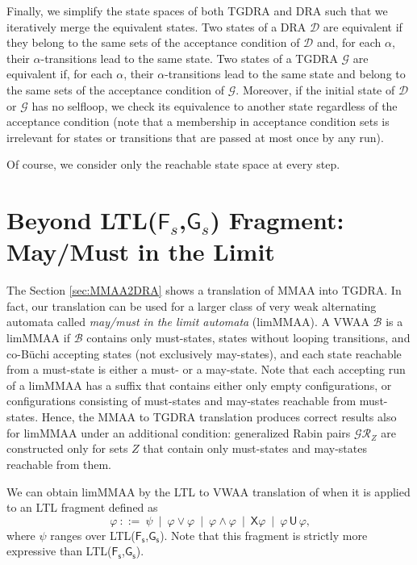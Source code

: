 \documentclass{llncs}
\newcommand{\X}{\mathsf{X}}     \newcommand{\U}{{\,\uU\,}}      \newcommand{\uU}{\mathsf{U}}    \newcommand{\rR}{\mathsf{R}}    \newcommand{\R}{{\,\rR\,}}      \newcommand{\F}{\mathsf{F}}     \newcommand{\G}{\mathsf{G}}     \newcommand{\Fs}{{\F\!\s}}      \newcommand{\Gs}{{\G\s}}        \newcommand{\s}{_\mathsf{s}}
\newcommand{\mB}{\mathcal{B}}
\newcommand{\mD}{\mathcal{D}}
\newcommand{\mG}{\mathcal{G}}
\newcommand{\mGR}{\mathcal{GR}}
\begin{document}
Finally, we simplify the state spaces of both TGDRA and DRA such that we
iteratively merge the equivalent states. Two states of a DRA $\mD$ are
equivalent if they belong to the same sets of the acceptance condition of
$\mD$ and, for each $\alpha$, their $\alpha$-transitions lead to the same
state. Two states of a TGDRA $\mG$ are equivalent if, for each $\alpha$,
their $\alpha$-transitions lead to the same state and belong to the same
sets of the acceptance condition of $\mG$. Moreover, if the initial state of
$\mD$ or $\mG$ has no selfloop, we check its equivalence to another state
regardless of the acceptance condition (note that a membership in acceptance
condition sets is irrelevant for states or transitions that are passed at
most once by any run).



Of course, we consider only the reachable state space at every step.



\section{Beyond LTL($\F_s$,$\G_s$) Fragment: May/Must in the Limit}
\label{sec:limmmaa}

The Section \ref{sec:MMAA2DRA} shows a translation of MMAA into TGDRA.  In
fact, our translation can be used for a larger class of very weak
alternating automata called \emph{may/must in the limit automata} (limMMAA).
A VWAA $\mB$ is a limMMAA if $\mB$ contains only must-states, states without
looping transitions, and co-B\"{u}chi accepting states (not exclusively
may-states), and each state reachable from a must-state is either a must- 
or a may-state. Note that each accepting run of a limMMAA has a suffix that
contains either only empty configurations, or configurations consisting of
must-states and may-states reachable from must-states. Hence, the MMAA to
TGDRA translation produces correct results also for limMMAA under an
additional
condition: generalized Rabin pairs $\mGR_Z$ are constructed only for sets
$Z$ that contain only must-states and may-states reachable from them.

We can obtain limMMAA by the LTL to VWAA translation of \cite{GO01} when it
is applied to an LTL fragment defined as
\[\varphi~::=~\psi~\mid~\varphi\vee\varphi~\mid~\varphi\wedge\varphi~\mid~
\X\varphi~\mid~\varphi\U\varphi\text{,}
\]
where $\psi$ ranges over LTL($\Fs$,$\Gs$). Note that this fragment is
strictly more expressive than LTL($\Fs$,$\Gs$).
\end{document}
